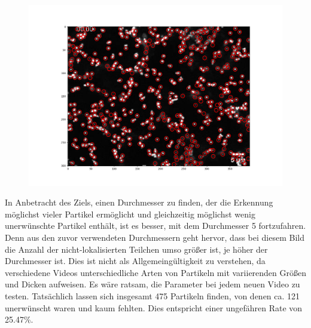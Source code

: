 \begin{enumerate}
\begin{figure}[H]
	\begin{minipage}{.5\textwidth}
     	\centering
  	  	\includegraphics[scale=0.3]{Grafiken/trackpyBilder/locate(frames[0], 5).png}
 		 \label{fig:test2}
    \end{minipage}
\end{figure}

In Anbetracht des Ziels, einen Durchmesser zu finden, der die Erkennung möglichst vieler Partikel ermöglicht und gleichzeitig möglichst wenig unerwünschte Partikel enthält, ist es besser, mit dem Durchmesser 5 fortzufahren. Denn aus den zuvor verwendeten Durchmessern geht hervor, dass bei diesem Bild die Anzahl der nicht-lokalisierten Teilchen umso größer ist, je höher der Durchmesser ist. 
Dies ist nicht als Allgemeingültigkeit zu verstehen, da verschiedene Videos unterschiedliche Arten von Partikeln mit variierenden Größen und Dicken aufweisen. Es wäre ratsam, die Parameter bei jedem neuen Video zu testen.
Tatsächlich lassen sich insgesamt 475 Partikeln finden, von denen ca. 121 unerwünscht waren und kaum fehlten. Dies entspricht einer ungefähren Rate von 25.47\%.


\end{enumerate}
